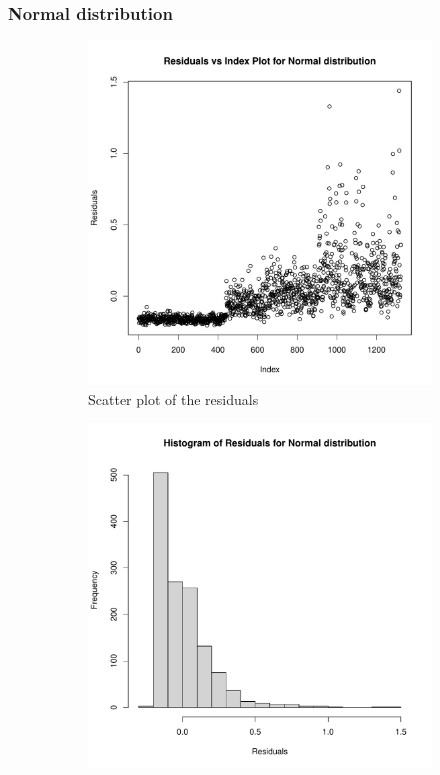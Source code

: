 \documentclass[12pt,a4paper,twoside]{article}
\begin{document}
\subsubsection{Normal distribution}
\label{sssec:gaussian}
\begin{figure}[!ht]
    \begin{subfigure}{.45\textwidth}
        \centering
        \includegraphics[width=\linewidth]{img/Normal_distribution_20x20.pdf}
        \caption{Scatter plot of the residuals}
        \label{fig:gaussianscatter20}
    \end{subfigure}
    \begin{subfigure}{.45\textwidth}
        \centering
        \includegraphics[width=\linewidth]{img/Normal_distribution_histogram_20x20.pdf}

\end{subfigure}
\end{figure}
\end{document}
